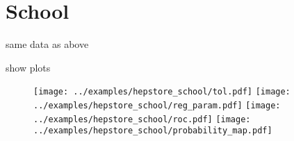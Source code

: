 
\section{School}



same data as above

%
%
%
\begin{changemargin}{1.5cm}{1.5cm} 
  
\end{changemargin}
%
show plots
%
\begin{figure}
  \centering
  \texttt{[image: ../examples/hepstore\_school/tol.pdf]}
  \texttt{[image: ../examples/hepstore\_school/reg\_param.pdf]}
  \texttt{[image: ../examples/hepstore\_school/roc.pdf]}
  \texttt{[image: ../examples/hepstore\_school/probability\_map.pdf]}
  \caption{}
  \label{fig:example_plotting}
\end{figure}
%
